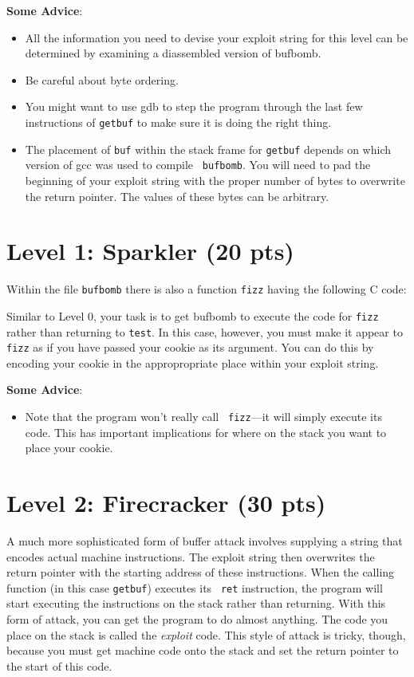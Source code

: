 \documentclass[11pt]{article}
\newenvironment{ccode}%
{\small}%
{}
\begin{document}
{\bf Some Advice}:
\begin{itemize}
\item All the information you need to devise your exploit
string for this level can be determined by examining a diassembled
version of {\sc bufbomb}.
\item
Be careful about byte ordering.  
\item
You might
want to use {\sc gdb} to step the program through the last few
instructions of {\tt getbuf} to make sure it is doing the right thing.
\item
The placement of {\tt buf} within the stack frame for {\tt getbuf}
depends on which version of {\sc gcc} was used to compile {\tt
bufbomb}.  You will need to pad the beginning of your exploit string
with the proper number of bytes to overwrite the return pointer.  The
values of these bytes can be arbitrary.
\end{itemize}

\section*{Level 1: Sparkler (20 pts)}

Within the file {\tt bufbomb} there is also a function {\tt fizz}
having the following C code:

\begin{ccode}

\end{ccode}

Similar to Level 0, your task is to get {\sc bufbomb} to execute the
code for {\tt fizz} rather than returning to {\tt test}.  In this
case, however, you must make it appear to {\tt fizz} as if you have
passed your cookie as its argument.  You can do this by encoding your
cookie in the appropropriate place within your exploit string.

{\bf Some Advice}: 
\begin{itemize}
\item Note that the program won't really call {\tt
fizz}---it will simply execute its code.  This has important
implications for where on the stack you want to place your
cookie.
\end{itemize}

\section*{Level 2: Firecracker (30 pts)}

A much more sophisticated form of buffer attack involves supplying a string
that encodes actual machine instructions.  The exploit string then
overwrites the return pointer with the starting address of these instructions.
When the calling function (in this case {\tt getbuf}) executes its {\tt
ret} instruction, the program will start executing the instructions on
the stack rather than returning.  With this form of attack, you can get
the program to do almost anything.  The code you place on the stack is
called the {\em exploit} code.  This style of attack is tricky,
though, because you must get machine code onto the stack and set the
return pointer to the start of this code.
\end{document}
